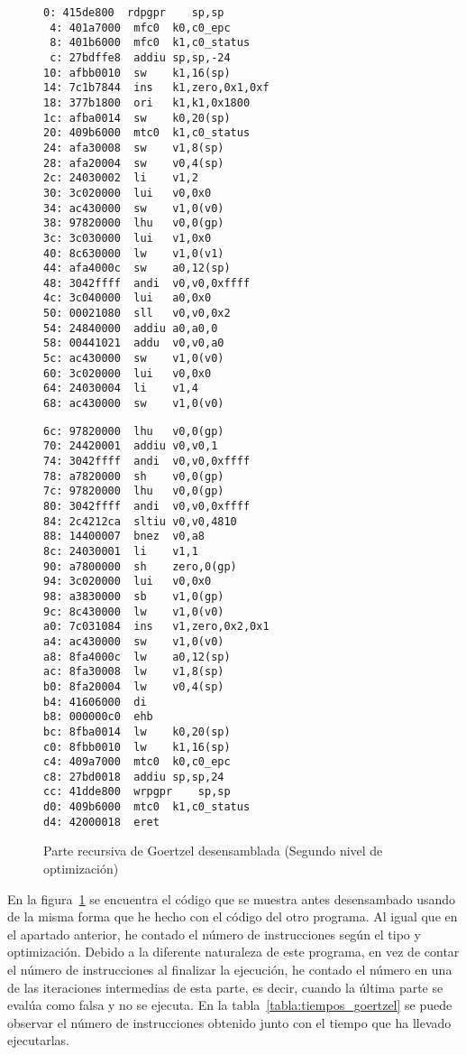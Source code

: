 \begin{figure}[htb]
  \begin{minipage}{.45\textwidth}
\begin{lstlisting}[language={[mips]Assembler},basicstyle=\ttfamily\scriptsize]
 0:	415de800  rdpgpr	sp,sp
 4:	401a7000  mfc0	k0,c0_epc
 8:	401b6000  mfc0	k1,c0_status
 c:	27bdffe8  addiu	sp,sp,-24
10:	afbb0010  sw	k1,16(sp)
14:	7c1b7844  ins	k1,zero,0x1,0xf
18:	377b1800  ori	k1,k1,0x1800
1c:	afba0014  sw	k0,20(sp)
20:	409b6000  mtc0	k1,c0_status
24:	afa30008  sw	v1,8(sp)
28:	afa20004  sw	v0,4(sp)
2c:	24030002  li	v1,2
30:	3c020000  lui	v0,0x0
34:	ac430000  sw	v1,0(v0)
38:	97820000  lhu	v0,0(gp)
3c:	3c030000  lui	v1,0x0
40:	8c630000  lw	v1,0(v1)
44:	afa4000c  sw	a0,12(sp)
48:	3042ffff  andi	v0,v0,0xffff
4c:	3c040000  lui	a0,0x0
50:	00021080  sll	v0,v0,0x2
54:	24840000  addiu	a0,a0,0
58:	00441021  addu	v0,v0,a0
5c:	ac430000  sw	v1,0(v0)
60:	3c020000  lui	v0,0x0
64:	24030004  li	v1,4
68:	ac430000  sw	v1,0(v0)
\end{lstlisting}
\end{minipage}
\hfill
\begin{minipage}{.45\textwidth}
\begin{lstlisting}[language={[mips]Assembler},basicstyle=\ttfamily\scriptsize]
6c:	97820000  lhu	v0,0(gp)
70:	24420001  addiu	v0,v0,1
74:	3042ffff  andi	v0,v0,0xffff
78:	a7820000  sh	v0,0(gp)
7c:	97820000  lhu	v0,0(gp)
80:	3042ffff  andi	v0,v0,0xffff
84:	2c4212ca  sltiu	v0,v0,4810
88:	14400007  bnez	v0,a8
8c:	24030001  li	v1,1
90:	a7800000  sh	zero,0(gp)
94:	3c020000  lui	v0,0x0
98:	a3830000  sb	v1,0(gp)
9c:	8c430000  lw	v1,0(v0)
a0:	7c031084  ins	v1,zero,0x2,0x1
a4:	ac430000  sw	v1,0(v0)
a8:	8fa4000c  lw	a0,12(sp)
ac:	8fa30008  lw	v1,8(sp)
b0:	8fa20004  lw	v0,4(sp)
b4:	41606000  di
b8:	000000c0  ehb
bc:	8fba0014  lw	k0,20(sp)
c0:	8fbb0010  lw	k1,16(sp)
c4:	409a7000  mtc0	k0,c0_epc
c8:	27bd0018  addiu	sp,sp,24
cc:	41dde800  wrpgpr	sp,sp
d0:	409b6000  mtc0	k1,c0_status
d4:	42000018  eret
 \end{lstlisting}
 \end{minipage}
 \caption{Parte recursiva de Goertzel desensamblada (Segundo nivel de optimización)}
 \label{goertzel_recursivo_ensamblador}
 \end{figure}
 En la figura~\ref{goertzel_recursivo_ensamblador} se encuentra el código que se muestra antes desensambado usando  de la misma forma que he hecho con el código del otro programa. Al igual que en el apartado anterior, he contado el número de instrucciones según el tipo y optimización. Debido a la diferente naturaleza de este programa, en vez de contar el número de instrucciones al finalizar la ejecución, he contado el número en una de las iteraciones intermedias de esta parte, es decir, cuando la última parte se evalúa como falsa y no se ejecuta. En la tabla~\ref{tabla:tiempos_goertzel} se puede observar el número de instrucciones obtenido junto con el tiempo que ha llevado ejecutarlas.

